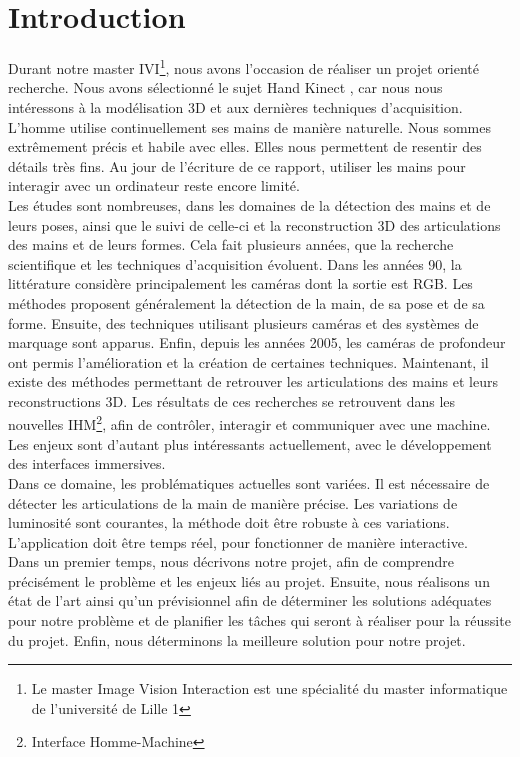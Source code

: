 \chapter*{Introduction}

Durant notre master IVI\footnote{Le master Image Vision Interaction est 
une spécialité du master informatique de l'université de Lille 1}, 
nous avons l'occasion de réaliser un projet orienté recherche. Nous avons 
sélectionné le sujet \og Hand Kinect \fg, car nous nous intéressons à la 
modélisation 3D et aux dernières techniques d'acquisition.\\

L'homme utilise continuellement ses mains de manière naturelle. Nous 
sommes extrêmement précis et habile avec elles. Elles nous permettent 
de resentir des détails très fins. Au jour de l'écriture de ce rapport, 
utiliser les mains pour interagir avec un ordinateur reste encore limité.\\

Les études sont nombreuses, dans les domaines de la détection des mains 
et de leurs poses, ainsi que le suivi de celle-ci et la reconstruction 
3D des articulations des mains et de leurs formes. Cela fait plusieurs 
années, que la recherche scientifique et les techniques d'acquisition 
évoluent. Dans les années 90, la littérature considère principalement les 
caméras dont la sortie est RGB. Les méthodes proposent généralement la 
détection de la main, de sa pose et de sa forme. Ensuite, des techniques 
utilisant plusieurs caméras et des systèmes de marquage sont apparus. 
Enfin, depuis les années 2005, les caméras de profondeur ont permis 
l'amélioration et la création de certaines techniques. Maintenant, il 
existe des méthodes permettant de retrouver les articulations des mains 
et leurs reconstructions 3D. Les résultats de ces recherches se 
retrouvent dans les nouvelles IHM\footnote{Interface Homme-Machine}, 
afin de contrôler, interagir et communiquer avec une machine. Les enjeux 
sont d'autant plus intéressants actuellement, avec le développement des 
interfaces immersives.\\

Dans ce domaine, les problématiques actuelles sont variées. Il est 
nécessaire de détecter les articulations de la main de manière précise. 
Les variations de luminosité sont courantes, la méthode doit être robuste 
à ces variations. L'application doit être temps réel, pour fonctionner de 
manière interactive.\\


Dans un premier temps, nous décrivons notre projet, afin de comprendre 
précisément le problème et les enjeux liés au projet. Ensuite, nous 
réalisons un état de l'art ainsi qu'un prévisionnel afin de déterminer 
les solutions adéquates pour notre problème et de planifier les tâches 
qui seront à réaliser pour la réussite du projet. Enfin, nous déterminons 
la meilleure solution pour notre projet.\\


